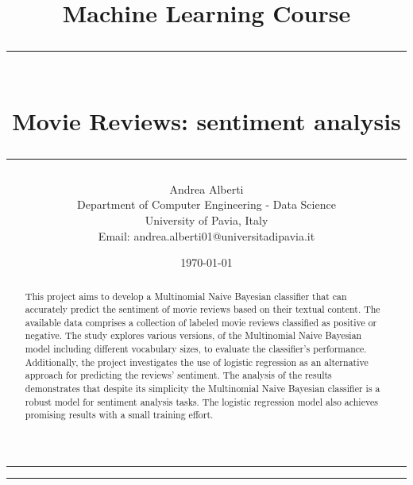 \documentclass{article}
\title{\Large Machine Learning Course\vspace{0.8cm}\\
    \rule{\textwidth}{0.3pt}\vspace{0.3cm}\\
    \textbf{Movie Reviews: sentiment analysis}\vspace{0.1cm}\\
    \rule{\textwidth}{0.3pt}\vspace{0.8cm}}
\author{Andrea Alberti\vspace{0.5cm}\\
    \small Department of Computer Engineering - Data Science\\[0.2cm]
    \small University of Pavia, Italy \\
    \small Email: andrea.alberti01@universitadipavia.it}\vspace{0.5cm}
\date{\today}
\begin{document}
\begin{titlepage}
   
        \maketitle
        \thispagestyle{empty}

    \begin{multicols*}{2}
            
        \hrule
        \begin{abstract}

        \noindent
        This project aims to develop a Multinomial Naive Bayesian classifier that can accurately predict the sentiment of movie reviews based on their textual content. 
        The available data comprises a collection of labeled movie reviews classified as positive or negative. The study explores various versions, of
        the Multinomial Naive Bayesian model including different vocabulary sizes, to evaluate the classifier's performance.
        Additionally, the project investigates the use of logistic regression as an alternative approach for predicting the reviews' sentiment. The analysis of 
        the results demonstrates that despite its simplicity the Multinomial Naive Bayesian classifier is a robust model for sentiment analysis tasks. The logistic regression model also
        achieves promising results with a small training effort.
        \end{abstract}
     \newcolumn
        \hrule\vspace{0.1cm}
        \tableofcontents
    \end{multicols*}

\end{titlepage}

\newpage
{}



\end{document}
